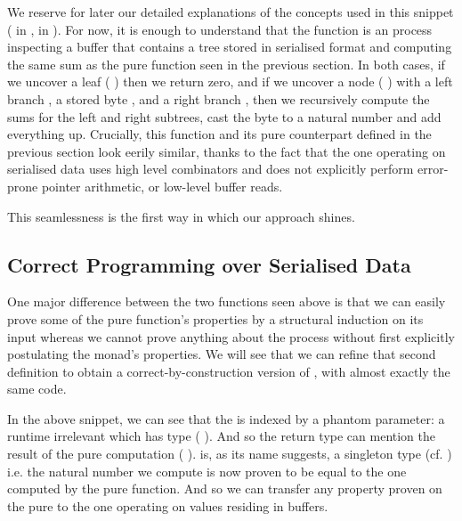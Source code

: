 We reserve for later our detailed explanations of the concepts
used in this snippet
( in ,
 in ).
%
For now, it is enough to understand that the function
is an  process
inspecting a buffer that contains a tree stored in serialised format
and computing the same sum as the pure function seen in the previous section.
%
In both cases, if we uncover a leaf
({ \IdrisData{\#}} \IdrisKeyword{\KatlaUnderscore{}})
then we return zero,
and if we uncover a node
({ \IdrisData{\#}}  \IdrisData{\#}  \IdrisData{\#} )
with
a left branch ,
a stored byte ,
and a right branch ,
then we recursively compute the sums for the left and right subtrees,
cast the byte to a natural number and add everything up.
%
Crucially, this function and its pure counterpart defined in the previous
section look eerily similar, thanks to the fact that the one operating on
serialised data uses high level combinators and does not explicitly
perform error-prone pointer arithmetic, or low-level buffer reads.

This seamlessness is the first way in which our approach shines.

\subsection{Correct Programming over Serialised Data}

One major difference between the two functions seen above is that
we can easily prove some of the pure function's properties by a structural
induction on its input whereas we
cannot prove anything about the  process without first
explicitly postulating the  monad's properties.
%
We will see that we can refine that second definition to obtain
a correct-by-construction version of
, with almost exactly the same code.


In the above snippet, we can see that the  is indexed
by a phantom parameter: a runtime irrelevant  which has type
( ).
%
And so the return type can mention the result of the pure computation
( ).
%
 is, as its name suggests, a singleton type
(cf. )
i.e. the natural number we compute is now proven to be equal to the
one computed by the pure  function. And so we can
transfer any property proven on the pure  to the
one operating on values residing in buffers.

